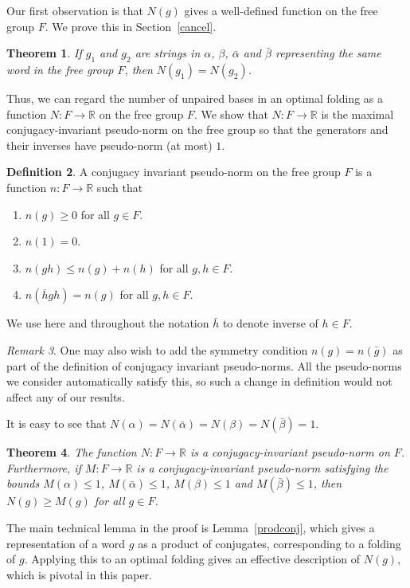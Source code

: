 \documentclass{amsart}
\theoremstyle{plain}
\newtheorem{theorem}{Theorem}[section]
\theoremstyle{definition}
\newtheorem{definition}[theorem]{Definition}
\theoremstyle{remark}
\newtheorem{remark}[theorem]{Remark}
\newcommand{\R}{\mathbb{R}}
\renewcommand{\a}{\alpha}
\renewcommand{\b}{\beta}
\newcommand{\ba}{\bar{\alpha}}
\newcommand{\bb}{\bar{\beta}}
\begin{document}
Our first observation is that $N(g)$  gives a well-defined function on the free group $F$. We prove this in Section~\ref{cancel}.

\begin{theorem}\label{welldef}
If $g_1$ and $g_2$ are strings in $\a$, $\b$, $\ba$ and $\bb$ representing the same word in the free group $F$, then $N(g_1)=N(g_2)$.
\end{theorem}

Thus, we can regard  the number of unpaired bases in an optimal folding as a function $N:F\to \R$ on the free group $F$. We show that $N:F\to\R$
is the maximal conjugacy-invariant   pseudo-norm  on the free group so that the generators and their inverses have   pseudo-norm  (at most) $1$. 

\begin{definition}\label{cnjinvnrm}
A conjugacy invariant   pseudo-norm  on the free group $F$ is a function $n:F\to\R$ such that
\begin{enumerate}
\item $n(g)\geq 0$ for all $g\in F$.
\item $n(1)=0$.
\item $n(gh)\leq n(g)+n(h)$  for all $g,h\in F$.
\item $n(\overline{h}gh)=n(g)$ for all $g,h\in F$.
\end{enumerate}
\end{definition}

We use here and throughout the notation $\bar{h}$ to denote inverse of $h\in F$.

\begin{remark}
One may also wish to add the symmetry condition $n(g)=n(\bar g)$ as part of the definition of conjugacy invariant   pseudo-norms. All the   pseudo-norms we consider automatically satisfy this, so such a change in definition would not affect any of our results.
\end{remark}

It is easy to see that $N(\a)=N(\ba)=N(\b)=N(\bb)=1$.

\begin{theorem}\label{maxconj}
The function $N:F\to \R$ is a conjugacy-invariant   pseudo-norm  on $F$. Furthermore, if $M:F\to \R$ is a conjugacy-invariant   pseudo-norm  satisfying the bounds $M(\a)\leq 1$, $M(\ba)\leq 1$, $M(\b)\leq 1$ and $M(\bb)\leq 1$, then $N(g)\geq M(g)$ for all $g\in F$.
\end{theorem}

The main technical lemma in the proof is Lemma~\ref{prodconj}, which gives a representation of a word $g$ as a product of conjugates, corresponding to a folding of $g$. Applying this to an optimal folding gives an effective description of $N(g)$, which is pivotal in this paper.
\end{document}

